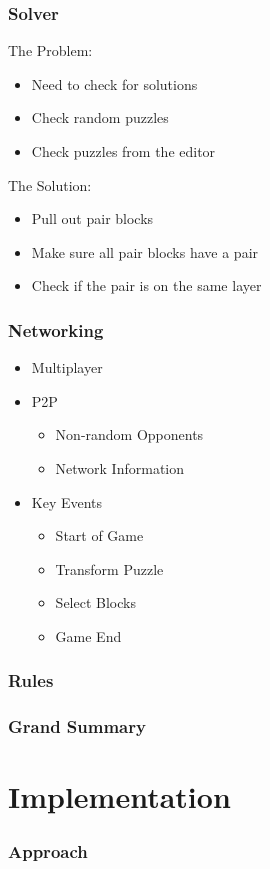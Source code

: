 \documentclass{beamer}
\begin{document}
\begin{frame}
    \frametitle{Solver} %
    The Problem:
    \begin{itemize}
	\pause \item Need to check for solutions
	\pause \item Check random puzzles
	\pause \item Check puzzles from the editor
	\end{itemize}
	
	\pause The Solution:
	\begin{itemize}
	\pause \item Pull out pair blocks
	\pause \item Make sure all pair blocks have a pair
	\pause \item Check if the pair is on the same layer
	\end{itemize}
\end{frame}

\begin{frame}
    \frametitle{Networking} %
    \begin{itemize}
        \pause \item Multiplayer
        \pause \item P2P
        \begin{itemize}
            \pause \item Non-random Opponents
            \pause \item Network Information
        \end{itemize}
        \pause \item Key Events
        \begin{itemize}
            \pause \item Start of Game
            \pause \item Transform Puzzle
            \pause \item Select Blocks
            \pause \item Game End
	\end{itemize}
    \end{itemize}
\end{frame}

\begin{frame}
    \frametitle{Rules} %
\end{frame}

\begin{frame}
    \frametitle{Grand Summary} %
\end{frame}


\section{Implementation}
\begin{frame}
  \frametitle{Approach} %
\end{frame}
\end{document}
